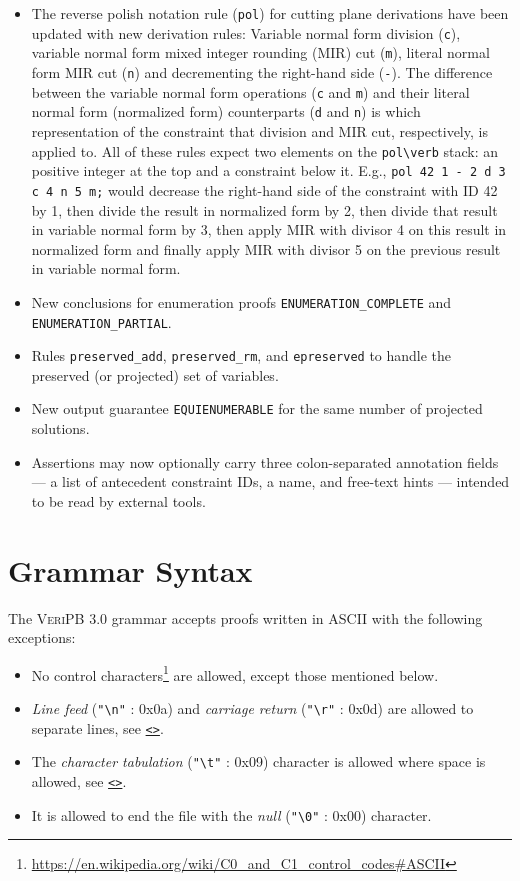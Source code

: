 \documentclass[a4paper]{article}
\newcommand{\lnkBNF}[1]{\hyperlink{def:#1}{<\detokenize{#1}>}}
\newcommand{\veriPB}[0]{\textsc{VeriPB}}
\begin{document}
\begin{itemize}
	\item The reverse polish notation rule (\verb!pol!) for cutting plane derivations have been updated with new derivation rules: Variable normal form division (\verb!c!), variable normal form mixed integer rounding (MIR) cut (\verb!m!), literal normal form MIR cut (\verb!n!) and decrementing the right-hand side (\verb!-!). The difference between the variable normal form operations (\verb!c! and \verb!m!) and their literal normal form (normalized form) counterparts (\verb!d! and \verb!n!) is which representation of the constraint that division and MIR cut, respectively, is applied to. All of these rules expect two elements on the \verb!pol\verb! stack: an positive integer at the top and a constraint below it. E.g., \lstinline[language=veripb]!pol 42 1 - 2 d 3 c 4 n 5 m;! would decrease the right-hand side of the constraint with ID 42 by 1, then divide the result in normalized form by 2, then divide that result in variable normal form by 3, then apply MIR with divisor 4 on this result in normalized form and finally apply MIR with divisor 5 on the previous result in variable normal form.
	\item New conclusions for enumeration proofs \lstinline[language=veripb]!ENUMERATION_COMPLETE! and \lstinline[language=veripb]!ENUMERATION_PARTIAL!.
	\item Rules \lstinline[language=veripb]!preserved_add!, \lstinline[language=veripb]!preserved_rm!, and \lstinline[language=veripb]!epreserved! to handle the preserved (or projected) set of variables.
	\item New output guarantee \lstinline[language=veripb]!EQUIENUMERABLE! for the same number of projected solutions.
	\item Assertions may now optionally carry three colon-separated annotation fields — a list
of antecedent constraint IDs, a name, and free-text hints — intended to be read by external tools.
\end{itemize}

\section{Grammar Syntax}\label{sec:syntax}
The \veriPB{} 3.0 grammar accepts proofs written in ASCII with the following exceptions:
\begin{itemize}
	\item No control characters\footnote{\url{https://en.wikipedia.org/wiki/C0_and_C1_control_codes\#ASCII}} are allowed, except those mentioned below.
	\item \emph{Line feed} (\lstinline!"\n"! : 0x0a) and \emph{carriage return} (\lstinline!"\r"! : 0x0d) are allowed to separate lines, see \texttt{\lnkBNF{eol}}.
	\item The \emph{character tabulation} (\lstinline!"\t"! : 0x09) character is allowed where space is allowed, see \texttt{\lnkBNF{space}}.
	\item It is allowed to end the file with the \emph{null} (\lstinline!"\0"! : 0x00) character.
\end{itemize}
\end{document}
